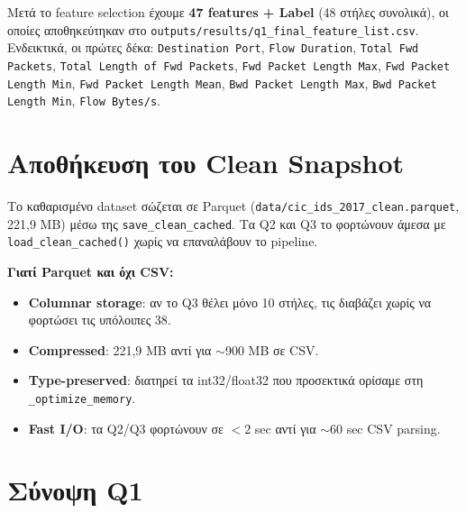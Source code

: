 \documentclass[12pt,a4paper,twoside]{book}
\begin{document}
Μετά το feature selection έχουμε \textbf{47 features + Label} (48 στήλες
συνολικά), οι οποίες αποθηκεύτηκαν στο
\texttt{outputs/results/q1\_final\_feature\_list.csv}. Ενδεικτικά, οι πρώτες
δέκα: \texttt{Destination Port}, \texttt{Flow Duration},
\texttt{Total Fwd Packets}, \texttt{Total Length of Fwd Packets},
\texttt{Fwd Packet Length Max}, \texttt{Fwd Packet Length Min},
\texttt{Fwd Packet Length Mean}, \texttt{Bwd Packet Length Max},
\texttt{Bwd Packet Length Min}, \texttt{Flow Bytes/s}.

\section{Αποθήκευση του Clean Snapshot}

Το καθαρισμένο dataset σώζεται σε Parquet
(\texttt{data/cic\_ids\_2017\_clean.parquet}, 221,9 MB) μέσω της
\texttt{save\_clean\_cached}. Τα Q2 και Q3 το φορτώνουν άμεσα με
\texttt{load\_clean\_cached()} χωρίς να επαναλάβουν το pipeline.

\textbf{Γιατί Parquet και όχι CSV:}
\begin{itemize}
    \item \textbf{Columnar storage}: αν το Q3 θέλει μόνο 10 στήλες, τις
    διαβάζει χωρίς να φορτώσει τις υπόλοιπες 38.
    \item \textbf{Compressed}: 221,9 MB αντί για \(\sim\)900 MB σε CSV.
    \item \textbf{Type-preserved}: διατηρεί τα int32/float32 που
    προσεκτικά ορίσαμε στη \texttt{\_optimize\_memory}.
    \item \textbf{Fast I/O}: τα Q2/Q3 φορτώνουν σε \(<2\) sec αντί για
    \(\sim 60\) sec CSV parsing.
\end{itemize}

\section{Σύνοψη Q1}
\end{document}
